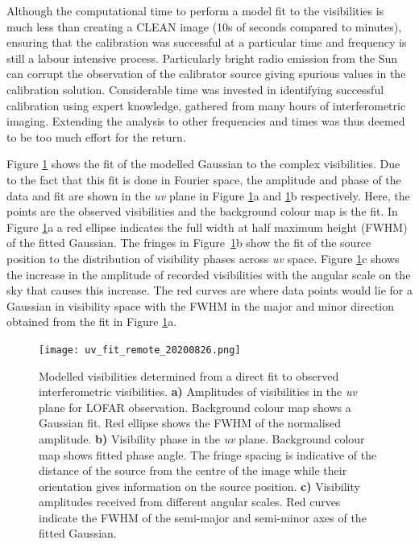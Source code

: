 Although the computational time to perform a model fit to the visibilities is much less than creating a CLEAN image (10s of seconds compared to minutes), ensuring that the calibration was successful at a particular time and frequency is still a labour intensive process. Particularly bright radio emission from the Sun can corrupt the observation of the calibrator source giving spurious values in the calibration solution. Considerable time was invested in identifying successful calibration using expert knowledge, gathered from many hours of interferometric imaging. Extending the analysis to other frequencies and times was thus deemed to be too much effort for the return.

Figure \ref{fig:uv_fit} shows the fit of the modelled Gaussian to the complex visibilities. Due to the fact that this fit is done in Fourier space, the amplitude and phase of the data and fit are shown in the \textit{uv} plane in Figure \ref{fig:uv_fit}a and \ref{fig:uv_fit}b respectively. Here, the points are the observed visibilities and the background colour map is the fit. In Figure \ref{fig:uv_fit}a a red ellipse indicates the full width at half maximum height (FWHM) of the fitted Gaussian. The fringes in Figure~\ref{fig:uv_fit}b show the fit of the source position to the distribution of visibility phases across \textit{uv} space.
Figure \ref{fig:uv_fit}c shows the increase in the amplitude of recorded visibilities with the angular scale on the sky that causes this increase. The red curves are where data points would lie for a Gaussian in visibility space with the FWHM in the major and minor direction obtained from the fit in Figure \ref{fig:uv_fit}a.

\begin{figure}
    \centering
    \texttt{[image: uv\_fit\_remote\_20200826.png]}
    \caption[Results of directly fitting LOFAR visibilities.]{Modelled visibilities determined from a direct fit to observed interferometric visibilities. \textbf{a)} Amplitudes of visibilities in the \textit{uv} plane for LOFAR observation. Background colour map shows a Gaussian fit. Red ellipse shows the FWHM of the normalised amplitude. \textbf{b)} Visibility phase in the \textit{uv} plane. Background colour map shows fitted phase angle. The fringe spacing is indicative of the distance of the source from the centre of the image while their orientation gives information on the source position. \textbf{c)} Visibility amplitudes received from different angular scales. Red curves indicate the FWHM of the semi-major and semi-minor axes of the fitted Gaussian.}
    \label{fig:uv_fit}
\end{figure}

